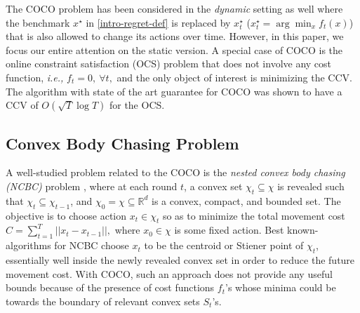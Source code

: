 The COCO problem has been considered in the {\it dynamic} setting as well  \citep{chen2018bandit, cao2018online, vazecocowiopt2022, liu2022simultaneously} where the benchmark $x^\star$ in \eqref{intro-regret-def} is replaced by $x_t^\star$ ($x_t^\star = \arg \min_x f_t(x)$) that is also allowed to change its actions over time. However, in this paper, we focus our entire attention on the static version.
A special case of COCO is the 
online constraint satisfaction (OCS) problem that does not involve any cost function, \emph{i.e.,} $f_t=0, \ \forall t,$ and the only object of interest is minimizing the CCV. The algorithm with state of the art guarantee for COCO \cite{Sinha2024} was shown to have a CCV of $O(\sqrt{T}\log T)$ for the OCS. 

\subsection{Convex Body Chasing Problem}  \label{cbc}
A well-studied problem related to the COCO is the
{\it nested convex body chasing (NCBC)} problem \citep{bansa2018nested,argue2019nearly,bubeck2020chasing}, 
where at each round $t$, a convex set $\chi_t \subseteq \chi$ is revealed such that 
$\chi_t\subseteq \chi_{t-1}$, and  $\chi_0=\chi \subseteq {\mathbb R}^d$ is a convex, compact, and bounded set. 
The objective is to choose action  $x_t \in \chi_t$ so as to minimize the total movement cost 
$C =   \sum_{t=1}^T  ||x_t - x_{t-1}||,$
where $x_0 \in \chi$ is some fixed action. Best known-algorithms for NCBC \citep{bansa2018nested,argue2019nearly,bubeck2020chasing} choose $x_t$ to be the 
centroid or Stiener point of $\chi_t$, essentially well inside the newly revealed convex set in order to reduce the future movement cost. 
With COCO, such an approach does not provide any useful bounds because of the presence of cost functions $f_t$'s whose minima could be towards the boundary of relevant convex sets $S_t$'s.




